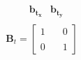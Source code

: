 \documentclass[preview]{standalone}
\begin{document}
\begin{align*}
\begin{array}{c}\begin{matrix}\quad \quad \mathbf{b_{t_x}} & \mathbf{b_{t_y}} \end{matrix} \\\mathbf{B}_t = \begin{bmatrix} 1 & \quad 0 \\ \\0 & \quad 1 \end{bmatrix} \end{array}
\end{align*}
\end{document}
